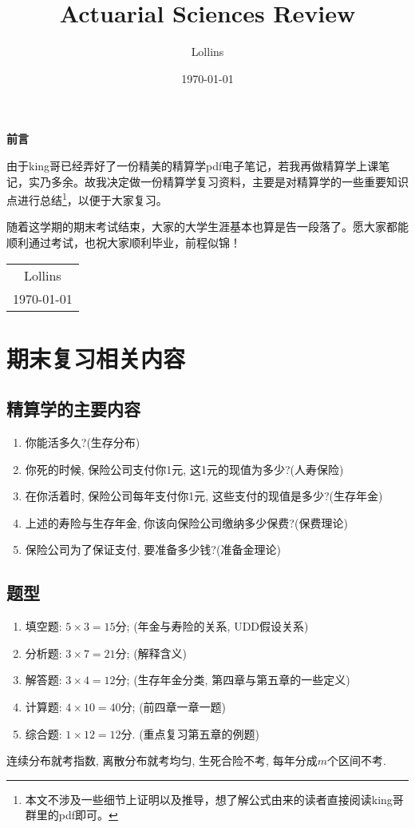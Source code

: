 \documentclass[lang=cn,10pt]{elegantbook}
\title{Actuarial Sciences Review}
\author{Lollins}
\institute{安徽师范大学数学与统计学院}
\date{\today}
\begin{document}
\maketitle

\begin{center}
	\Huge\textbf{前言}
\end{center}
\par
由于king哥已经弄好了一份精美的精算学pdf电子笔记，若我再做精算学上课笔记，实乃多余。故我决定做一份精算学复习资料，主要是对精算学的一些重要知识点进行总结\footnote{本文不涉及一些细节上证明以及推导，想了解公式由来的读者直接阅读king哥群里的pdf即可。}，以便于大家复习。

随着这学期的期末考试结束，大家的大学生涯基本也算是告一段落了。愿大家都能顺利通过考试，也祝大家顺利毕业，前程似锦！

\begin{flushright}
	\begin{tabular}{c}
		Lollins \\
		\today
	\end{tabular}
\end{flushright}

\newpage
{}
\setcounter{page}{1}
\tableofcontents
\newpage
\setcounter{page}{1}

\chapter*{期末复习相关内容}
\section*{精算学的主要内容}
\begin{enumerate}
    \item 你能活多久?(生存分布)
    \item 你死的时候, 保险公司支付你1元, 这1元的现值为多少?(人寿保险)
    \item 在你活着时, 保险公司每年支付你1元, 这些支付的现值是多少?(生存年金)
    \item 上述的寿险与生存年金, 你该向保险公司缴纳多少保费?(保费理论)
    \item 保险公司为了保证支付, 要准备多少钱?(准备金理论)
\end{enumerate}

\section*{题型}
\begin{enumerate}
	\item 填空题: $5\times 3 = 15$分; (年金与寿险的关系, UDD假设关系)
	\item 分析题: $3\times 7 = 21$分; (解释含义)
	\item 解答题: $3\times 4 = 12$分; (生存年金分类, 第四章与第五章的一些定义)
	\item 计算题: $4\times 10 = 40$分; (前四章一章一题)
	\item 综合题: $1\times 12 = 12$分. (重点复习第五章的例题)
\end{enumerate}
\begin{remark}
	连续分布就考指数, 离散分布就考均匀, 生死合险不考, 每年分成$m$个区间不考. 
\end{remark}
\end{document}
